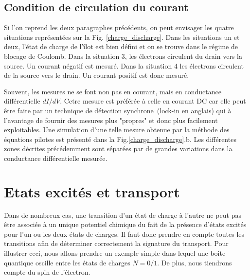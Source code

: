 \subsection{Condition de circulation du courant}

Si l'on reprend les deux paragraphes précédents, on peut envisager les quatre situations représentées sur la Fig. \ref{charge_discharge}. Dans les situations un et deux, l'état de charge de l'\^ilot est bien défini et on se trouve dans le régime de blocage de Coulomb. Dans la situation 3, les électrons circulent du drain vers la source. Un courant négatif est mesuré. Dans la situation 4 les électrons circulent de la source vers le drain. Un courant positif est donc mesuré.

Souvent, les mesures ne se font non pas en courant, mais en conductance différentielle $dI/dV$. Cetre mesure est préférée à celle en courant DC car elle peut \^etre faite par un technique de détection synchrone~(lock-in en anglais) qui à l'avantage de fournir des mesures plus "propres" et donc plus facilement exploitables. Une simulation d'une telle mesure obtenue par la méthode des équations pilotes est présenté dans la  Fig.\ref{charge_discharge}.b. Les différentes zones décrites précédemment sont séparées par de grandes variations dans la conductance différentielle mesurée.\newline





\section{Etats excités et transport}

Dans de nombreux cas, une transition d'un état de charge à l'autre ne peut pas être associée à un unique potentiel chimique du fait de la présence d'états excités pour l'un ou les deux états de charges. Il faut donc prendre en compte toutes les transitions afin de déterminer correctement la signature du transport. Pour illustrer ceci, nous allons prendre un exemple simple dans lequel une boite quantique oscille entre les états de charges $N=0/1$. De plus, nous tiendrons compte du spin de l'électron. 


